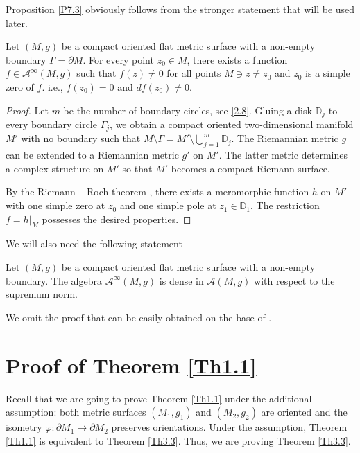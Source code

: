 \documentclass[12pt,reqno]{amsart}
\newcommand{\D}{\mathbb{D}}
\begin{document}
Proposition \ref{P7.3} obviously follows from the stronger statement that will be used later.

\begin{lemma} \label{L7.4}
Let $(M,g)$ be a compact oriented flat metric surface with a non-empty boundary $\Gamma=\partial M$.
For every point $z_0\in M$, there exists a function $f\in{\mathcal A}^\infty(M,g)$ such that $f(z)\neq0$ for all points $M\ni z\neq z_0$ and $z_0$ is a simple zero of $f$. i.e., $f(z_0)=0$ and $df(z_0)\neq0$.
\end{lemma}

\begin{proof}
Let $m$ be the number of boundary circles, see \eqref{2.8}. Gluing a disk ${\D}_j$ to every boundary circle $\Gamma_j$, we obtain a compact oriented two-dimensional manifold $M'$ with no boundary such that
$
M\setminus\Gamma=M'\setminus\bigcup_{j=1}^m{\D}_j.
$
The Riemannian metric $g$ can be extended to a Riemannian metric $g'$ on $M'$. The latter metric determines a
complex structure on $M'$ so that $M'$ becomes a compact Riemann surface.

By the Riemann -- Roch theorem \cite[Theorem 16.9]{F}, there exists a meromorphic function $h$ on $M'$ with one simple zero at $z_0$ and one simple pole at $z_1\in{\D}_1$. The restriction $f=h|_M$ possesses the desired properties.
\end{proof}

We will also need the following statement

\begin{proposition}
Let $(M,g)$ be a compact oriented flat metric surface with a non-empty boundary. The algebra ${\mathcal A}^\infty(M,g)$ is dense in ${\mathcal A}(M,g)$ with respect to the supremum norm.
\end{proposition}

We omit the proof that can be easily obtained on the base of \cite[Theorem 4.1]{Ar}.



\section{Proof of Theorem \ref{Th1.1}}

Recall that we are going to prove Theorem \ref{Th1.1} under the additional assumption: both metric surfaces $(M_1,g_1)$ and $(M_2,g_2)$ are oriented and the isometry $\varphi:\partial M_1\to\partial M_2$ preserves orientations. Under the assumption, Theorem \ref{Th1.1} is equivalent to Theorem \ref{Th3.3}. Thus, we are proving  Theorem \ref{Th3.3}.
\end{document}
